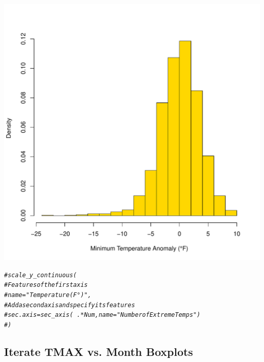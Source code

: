 \documentclass{article}\usepackage[]{graphicx}\usepackage[]{color}
\makeatletter
\def\maxwidth{ %
  \ifdim\Gin@nat@width>\linewidth
    \linewidth
  \else
    \Gin@nat@width
  \fi
}
\newcommand{\hlcom}[1]{\textcolor[rgb]{0.678,0.584,0.686}{\textit{#1}}}%
\newenvironment{kframe}{%
 \def\at@end@of@kframe{}%
 \ifinner\ifhmode%
  \def\at@end@of@kframe{\end{minipage}}%
  \begin{minipage}{\columnwidth}%
 \fi\fi%
 \def\FrameCommand##1{\hskip\@totalleftmargin \hskip-\fboxsep
 \colorbox{shadecolor}{##1}\hskip-\fboxsep
     \hskip-\linewidth \hskip-\@totalleftmargin \hskip\columnwidth}%
 \MakeFramed {\advance\hsize-\width
   \@totalleftmargin\z@ \linewidth\hsize
   \@setminipage}}%
 {\par\unskip\endMakeFramed%
 \at@end@of@kframe}
\newenvironment{knitrout}{}{} %
\makeatother
\begin{document}
\begin{knitrout}
\begin{kframe}
{\ttfamily\noindent\itshape{}}

{\ttfamily\noindent\color{warningcolor}{\#\# Warning: Removed 878 rows containing non-finite values\\\#\# (stat\_smooth).}}

{\ttfamily\noindent\color{warningcolor}{\#\# Warning: Removed 878 rows containing missing values (geom\_point).}}

{\ttfamily\noindent\color{warningcolor}{\#\# Warning: Removed 3 rows containing missing values (geom\_bar).}}\end{kframe}
\includegraphics[width=\maxwidth]{figure/unnamed-chunk-18-1} 
\begin{kframe}\begin{alltt}
\hlcom{#scale_y_continuous(}
    \hlcom{# Features of the first axis}
    \hlcom{# name = "Temperature (F °)",}
    \hlcom{# Add a second axis and specify its features}
    \hlcom{# sec.axis = sec_axis(~.*Num, name="Number of Extreme Temps")}
  \hlcom{#) }
\end{alltt}
\end{kframe}
\end{knitrout}

\subsection{Iterate TMAX vs. Month Boxplots}
\end{document}
